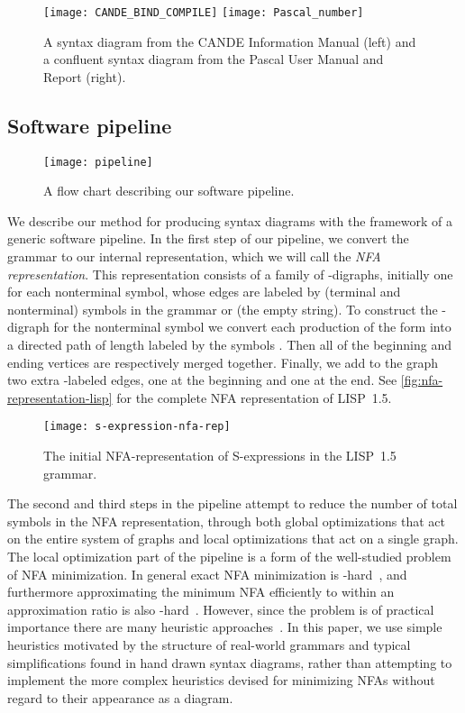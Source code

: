 \documentclass[10pt]{llncs}
\begin{document}
\begin{figure}
\centering
\texttt{[image: CANDE\_BIND\_COMPILE]}
\hfill
\texttt{[image: Pascal\_number]}
\caption{A syntax diagram from the CANDE Information Manual (left) and a confluent syntax diagram from the Pascal User Manual and Report (right).}
\label{fig:s-expressions-syntax-diagram}
\end{figure}

\subsection{Software pipeline}
\begin{figure}[t]
\texttt{[image: pipeline]}
\caption{A flow chart describing our software pipeline.}
\end{figure}
We describe our method for producing syntax diagrams with the framework of a generic software pipeline. In the first step of our pipeline, we convert the grammar to our internal representation, which we will call the \emph{NFA representation}. This representation consists of a family of -digraphs, initially one for each nonterminal symbol, whose edges are labeled by (terminal and nonterminal) symbols in the grammar or  (the empty string). To construct the -digraph for the nonterminal symbol  we convert each production of the form  into a directed path of length  labeled by the symbols . Then all of the beginning and ending vertices are respectively merged together. Finally, we add to the graph two extra -labeled edges, one at the beginning and one at the end. See \autoref{fig:nfa-representation-lisp} for the complete NFA representation of LISP~1.5.
\begin{figure}
\centering
\texttt{[image: s-expression-nfa-rep]}
\caption{The initial NFA-representation of S-expressions in the LISP~1.5 grammar.}
\label{fig:nfa-representation-lisp}
\end{figure}

The second and third steps in the pipeline attempt to reduce the number of total symbols in the NFA representation, through both global optimizations that act on the entire system of graphs and local optimizations that act on a single graph. The local optimization part of the pipeline is a form of the well-studied problem of NFA minimization. In general exact NFA minimization is -hard~\cite{HunRosSzy-JCSS-1976, StoMey-STOC-1973}, and furthermore approximating the minimum NFA efficiently to within an  approximation ratio is also -hard~\cite{GraSch-JCSS--2007}. However, since the problem is of practical importance there are many heuristic approaches~\cite{ChaCou-TCS-2004, HanWoo-TCS-2007}. In this paper, we use simple heuristics motivated by the structure of real-world grammars and typical simplifications found in hand drawn syntax diagrams, rather than attempting to implement the more complex heuristics devised for minimizing NFAs without regard to their appearance as a diagram.
\end{document}
